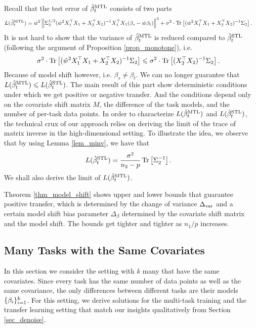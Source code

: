 Recall that the test error of $\hat{\beta}_{t}^{\text{MTL}}$ consists of two parts
\begin{align}
	L(\hat{\beta}_t^{\text{MTL}}) = \hat{w}^2 \left\| \Sigma_2^{1/2} (\hat{w}^2 X_1^{\top}X_1 + X_2^{\top}X_2)^{-1}X_1^{\top}X_1 (\beta_s - \hat{w}\beta_t) \right\|^2 + \sigma^2\cdot \operatorname{Tr}\left[(\hat{w}^2 X_1^{\top}X_1 + X_2^{\top}X_2)^{-1}\Sigma_2\right]. \label{eq_te_model_shift}
\end{align}
It is not hard to show that the variance of $\hat{\beta}_t^{\text{MTL}}$ is reduced compared to $\hat{\beta}_t^{\text{STL}}$ (following the argument of Proposition \ref{prop_monotone}), i.e.
\[ \sigma^2\cdot \operatorname{Tr}\left[(\hat{w}^2 X_1^{\top}X_1 + X_2^{\top}X_2)^{-1}\Sigma_2\right] \leqslant \sigma^2\cdot \operatorname{Tr}\left[(X_2^{\top}X_2)^{-1}\Sigma_2\right]. \]
Because of model shift however, i.e. $\beta_s \neq \beta_t$.
We can no longer guarantee that $L(\hat{\beta}_{t}^{\text{MTL}}) \leqslant L(\hat{\beta}_t^{\text{STL}})$.
The main result of this part show deterministic conditions under which we get positive or negative transfer.
And the conditions depend only on the covariate shift matrix $M$, the difference of the task models, and the number of per-task data points.
In order to characterize $L(\hat{\beta}_t^{\text{MTL}})$ and $L(\hat{\beta}_t^{\text{STL}})$, the technical crux of our approach relies on deriving the limit of the trace of matrix inverse in the high-dimensional setting.
To illustrate the idea, we observe that by using Lemma \ref{lem_minv}, we have that
\[ L(\hat{\beta}_t^{\text{STL}}) = \frac{\sigma^2}{n_2 - p}\operatorname{Tr}\left[\Sigma_2^{-1}\right]. \]
We shall also derive the limit of $L(\hat{\beta}_t^{\text{MTL}})$.





Theorem \ref{thm_model_shift} shows upper and lower bounds that guarantee positive transfer, which is determined by the change of variance $\Delta_{\text{var}}$ and a certain model shift bias parameter $\Delta_{\beta}$ determined by the covariate shift matrix and the model shift.
The bounds get tighter and tighter as $n_1 / p$ increases.


\subsection{Many Tasks with the Same Covariates}

In this section we consider the setting with $k$ many that have the same covariates.
Since every task has the same number of data points as well as the same covariance, the only differences between different tasks are their models $\{\beta_i\}_{i=1}^k$.
For this setting, we derive solutions for the multi-task training and the transfer learning setting that match our insights qualitatively from Section \ref{sec_denoise}.


